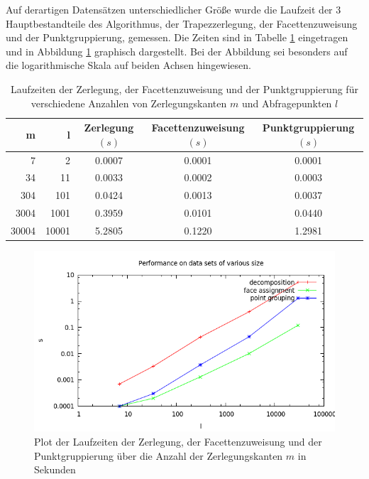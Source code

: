\documentclass[11pt, a4paper]{article}
\begin{document}
Auf derartigen Datensätzen unterschiedlicher Größe wurde die Laufzeit der 3 Hauptbestandteile des Algorithmus, der Trapezzerlegung, der Facettenzuweisung und der Punktgruppierung, gemessen. Die Zeiten sind in Tabelle \ref{tab:performance_table} eingetragen und in Abbildung \ref{fig:performance_plot} graphisch dargestellt. Bei der Abbildung sei besonders auf die logarithmische Skala auf beiden Achsen hingewiesen.

\begin{table}[h!]
	\centering
	\begin{tabular}{|r|r|c|c|c|}
		\hline
		m & l & Zerlegung $(s)$ & Facettenzuweisung $(s)$ & Punktgruppierung $(s)$ \\
		\hline
		7 & 2 & 0.0007 & 0.0001 & 0.0001 \\
		34 & 11 & 0.0033 & 0.0002 & 0.0003 \\
		304 & 101 & 0.0424 & 0.0013 & 0.0037 \\
		3004 & 1001 & 0.3959 & 0.0101 & 0.0440 \\
		30004 & 10001 & 5.2805 & 0.1220 & 1.2981 \\
		\hline
	\end{tabular}
	\caption{Laufzeiten der Zerlegung, der Facettenzuweisung und der Punktgruppierung für verschiedene Anzahlen von Zerlegungskanten $m$ und Abfragepunkten $l$}
	\label{tab:performance_table}
\end{table}

\begin{figure}[h!]
	\centering
	\includegraphics[width=\textwidth]{performance}
	\caption{Plot der Laufzeiten der Zerlegung, der Facettenzuweisung und der Punktgruppierung über die Anzahl der Zerlegungskanten $m$ in Sekunden}
	\label{fig:performance_plot}
\end{figure}
\end{document}
